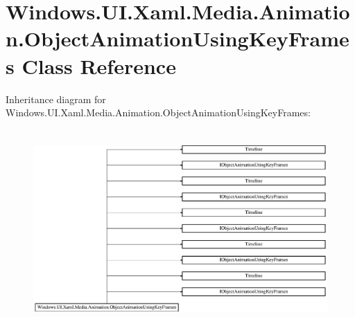 \hypertarget{class_windows_1_1_u_i_1_1_xaml_1_1_media_1_1_animation_1_1_object_animation_using_key_frames}{}\section{Windows.\+U\+I.\+Xaml.\+Media.\+Animation.\+Object\+Animation\+Using\+Key\+Frames Class Reference}
\label{class_windows_1_1_u_i_1_1_xaml_1_1_media_1_1_animation_1_1_object_animation_using_key_frames}
Inheritance diagram for Windows.\+U\+I.\+Xaml.\+Media.\+Animation.\+Object\+Animation\+Using\+Key\+Frames\+:\begin{figure}[H]
\begin{center}
\leavevmode
\includegraphics[height=7.586207cm]{class_windows_1_1_u_i_1_1_xaml_1_1_media_1_1_animation_1_1_object_animation_using_key_frames}
\end{center}
\end{figure}
